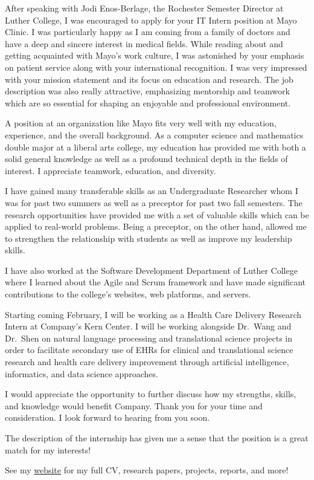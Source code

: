 \documentclass[a4paper,10pt,sans]{moderncv}
\date{\today}
\begin{document}
\makelettertitle%

\justify%

After speaking with Jodi Enos-Berlage, the Rochester Semester Director at
Luther College, I was encouraged to apply for your IT Intern position at Mayo
Clinic. I was particularly happy as I am coming from a family of doctors and
have a deep and sincere interest in medical fields. While reading about and
getting acquainted with Mayo's work culture, I was astonished by your emphasis
on patient service along with your international recognition. I was very
impressed with your mission statement and its focus on education and research.
The job description was also really attractive, emphasizing mentorship and
teamwork which are so essential for shaping an enjoyable and professional
environment.

A position at an organization like Mayo fits very well with my education,
experience, and the overall background. As a computer science and mathematics
double major at a liberal arts college, my education has provided me with both
a solid general knowledge as well as a profound technical depth in the fields
of interest. I appreciate teamwork, education, and diversity.

I have gained many transferable skills as an Undergraduate Researcher whom I
was for past two summers as well as a preceptor for past two fall semesters.
The research opportunities have provided me with a set of valuable skills which
can be applied to real-world problems. Being a preceptor, on the other hand,
allowed me to strengthen the relationship with students as well as improve my
leadership skills.

I have also worked at the Software Development Department of Luther College
where I learned about the Agile and Scrum framework and have made significant
contributions to the college's websites, web platforms, and servers.

Starting coming February, I will be working as a Health Care Delivery Research
Intern at Company's Kern Center. I will be working alongside Dr.~Wang and
Dr.~Shen on natural language processing and translational science projects in
order to facilitate secondary use of EHRs for clinical and translational
science research and health care delivery improvement through artificial
intelligence, informatics, and data science approaches.

I would appreciate the opportunity to further discuss how my strengths, skills,
and knowledge would benefit Company. Thank you for your time and consideration.
I look forward to hearing from you soon.

The description of the internship has given me a sense that the position is a
great match for my interests!

See my \href{https://www.davidoniani.com}{website} for my full CV, research
papers, projects, reports, and more!

\makeletterclosing%
\end{document}
